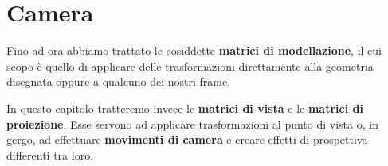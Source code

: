 \chapter{Camera}
Fino ad ora abbiamo trattato le cosiddette \textbf{matrici di modellazione}, il cui scopo \`e quello di applicare delle
trasformazioni direttamente alla geometria disegnata oppure a qualcuno dei nostri frame.

In questo capitolo tratteremo invece le \textbf{matrici di vista} e le \textbf{matrici di proiezione}. Esse servono ad
applicare trasformazioni al punto di vista o, in gergo, ad effettuare \textbf{movimenti di camera} e creare effetti di
prospettiva differenti tra loro.